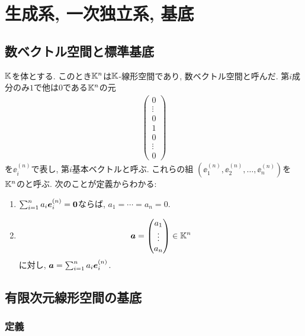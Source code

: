\chapter{生成系, 一次独立系, 基底}
\label{chap:basis}
\section{数ベクトル空間と標準基底}
\label{sec:basis:standard}
$\mathbb{K}$を体とする.
このとき$\mathbb{K}^n$は$\mathbb{K}$-線形空間であり,
数ベクトル空間と呼んだ.
第$i$成分のみ$1$で他は$0$である$\mathbb{K}^n$の元
\begin{align*}
  \begin{pmatrix}0\\\vdots\\0\\1\\0\\\vdots\\0\end{pmatrix}
\end{align*}
を$\ee^{(n)}_i$で表し,
第$i$基本ベクトルと呼ぶ.
これらの組 $(\ee^{(n)}_1,\ee^{(n)}_2,\ldots,\ee^{(n)}_n)$を
$\mathbb{K}^n$のと呼ぶ.
次のことが定義からわかる:
\begin{enumerate}
  \item
    $\sum_{i=1}^na_i\boldsymbol{e}^{(n)}_i=\boldsymbol{0}$ならば, $a_1=\cdots=a_n=0$.
\item
    \begin{align*}
      \boldsymbol{a}=\begin{pmatrix}a_1\\\vdots\\a_n\end{pmatrix}\in\mathbb{K}^n
    \end{align*}
    に対し, $\boldsymbol{a}=\sum_{i=1}^na_i\boldsymbol{e}^{(n)}_i$.
\end{enumerate}


\section{有限次元線形空間の基底}
\label{sec:basis:def}

\subsection{定義}


